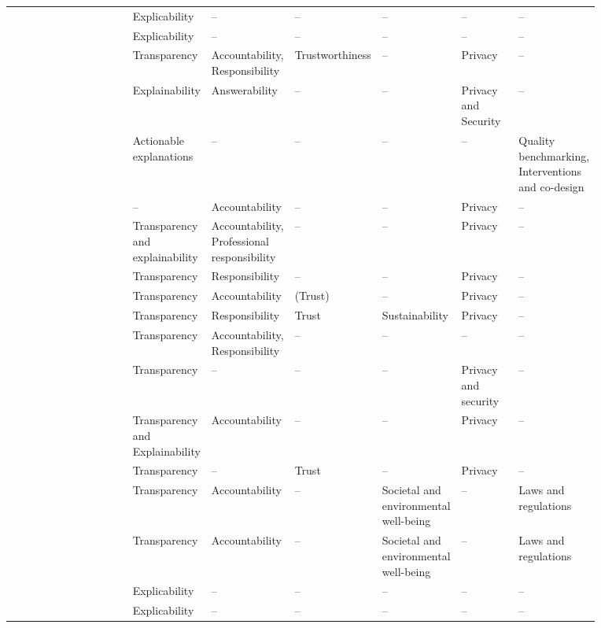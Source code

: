 \begin{landscape}
\begin{ThreePartTable}
\begin{longtable}{P{0.25\linewidth}P{0.12\linewidth}P{0.12\linewidth}P{0.08\linewidth}P{0.1\linewidth}P{0.1\linewidth}P{0.1\linewidth}}
        \textcite{Floridi_2018} & Explicability & -- & -- & -- & -- & -- \\ 
        \textcite{Floridi_2019} & Explicability & -- & -- & -- & -- & -- \\ 
        \textcite{Gianni_2022} & Transparency & Accountability, \mbox{Responsibility} & Trust\-worthiness & -- & Privacy & -- \\ 
        \textcite{Gupta_2021} & Explainability & Answerability & -- & -- & Privacy and \mbox{Security} & -- \\ 
        \textcite{Hacker_2022} & Actionable \mbox{explanations} & -- & -- & -- & -- & Quality benchmarking, \mbox{Interventions} and co-design \\ 
        \textcite{Hagendorff_2020} & -- & Accountability & -- & -- & Privacy & -- \\ 
        \textcite{Havrda_2020} & Transparency and explainability & Accountability, \mbox{Professional} \mbox{responsibility} & -- & -- & Privacy & -- \\ 
        \textcite{Henriksen_2021} & Transparency & Responsibility & -- & -- & Privacy & -- \\ 
        \textcite{Jakesch_2022} & Transparency & Accountability & (Trust)\tnote{*} & -- & Privacy & -- \\ 
        \textcite{Jobin_2019} & Transparency & Responsibility & Trust & Sustainability & Privacy & -- \\ 
        \textcite{Kumar_2021} & Transparency & Accountability, \mbox{Responsibility} & -- & -- & -- & -- \\ 
        \textcite{Liu_2021} & Transparency & -- & -- & -- & Privacy and \mbox{security} & -- \\ 
        \textcite{Lu_2022} & Transparency and Explainability & Accountability & -- & -- & Privacy & -- \\ 
        \textcite{Lukkien_2021} & Transparency & -- & Trust & -- & Privacy & -- \\ 
        \textcite{Merhi_2022} & Transparency & Accountability & -- & Societal and \mbox{environmental} well-being & -- & Laws and \mbox{regulations} \\ 
        \textcite{Mikalef_2022} & Transparency & Accountability & -- & Societal and \mbox{environmental} well-being & -- & Laws and \mbox{regulations} \\ 
        \textcite{Morley_2020} & Explicability & -- & -- & -- & -- & -- \\ 
        \textcite{Morley_2021} & Explicability & -- & -- & -- & -- & -- \\ 

\end{longtable}
\end{ThreePartTable}
\end{landscape}
